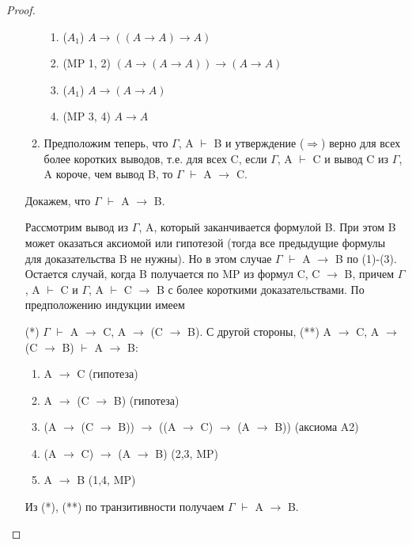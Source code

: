 \documentclass[a4paper]{article}
\theoremstyle{definition}
\theoremstyle{remark}
\begin{document}
\begin{proof}
\begin{itemize}
\begin{enumerate}
\begin{enumerate}
                        \item ($A_1$) $A\rightarrow ((A\rightarrow A)\rightarrow A)$ 
                        \item (MP 1, 2) $(A\rightarrow(A\rightarrow A))\rightarrow(A\rightarrow A)$
                        \item ($A_1$) $A\rightarrow (A\rightarrow A)$ 
                        \item (MP 3, 4) $A\rightarrow A$
                    \end{enumerate}
                \item Предположим теперь, что $\Gamma$, A $\vdash$ B и утверждение ($\Rightarrow$) верно для
                всех более коротких выводов, т.е.
                для всех C, если $\Gamma$, A $\vdash$ C и вывод C из $\Gamma$, A короче, чем вывод B, то
                $\Gamma$ $\vdash$ A $\rightarrow$ C.
            \end{enumerate}
            Докажем, что $\Gamma$ $\vdash$ A $\rightarrow$ B.
            
            Рассмотрим вывод из $\Gamma$, A, который заканчивается формулой B. При
            этом B может оказаться аксиомой или гипотезой (тогда все предыдущие
            формулы для доказательства B не нужны). Но в этом случае $\Gamma$ $\vdash$ A $\rightarrow$ B
            по (1)-(3).
            Остается случай, когда B получается по MP из формул C, C $\rightarrow$ B, причем $\Gamma$, A $\vdash$ C и $\Gamma$, A $\vdash$ C $\rightarrow$ B с более короткими доказательствами. По
            предположению индукции имеем
            
            (*) $\Gamma$ $\vdash$ A $\rightarrow$ C, A $\rightarrow$ (C $\rightarrow$ B).
            С другой стороны,
            (**) A $\rightarrow$ C, A $\rightarrow$ (C $\rightarrow$ B) $\vdash$ A $\rightarrow$ B:
            \begin{enumerate}
                \item A $\rightarrow$ C (гипотеза)
                \item A $\rightarrow$ (C $\rightarrow$ B) (гипотеза)
                \item (A $\rightarrow$ (C $\rightarrow$ B)) $\rightarrow$ ((A $\rightarrow$ C) $\rightarrow$ (A $\rightarrow$ B)) (аксиома A2)
                \item (A $\rightarrow$ C) $\rightarrow$ (A $\rightarrow$ B) (2,3, MP)
                \item A $\rightarrow$ B (1,4, MP)
            \end{enumerate}
            Из (*), (**) по транзитивности получаем $\Gamma$ $\vdash$ A $\rightarrow$ B.
        \end{itemize}
    \end{proof}
\end{document}
